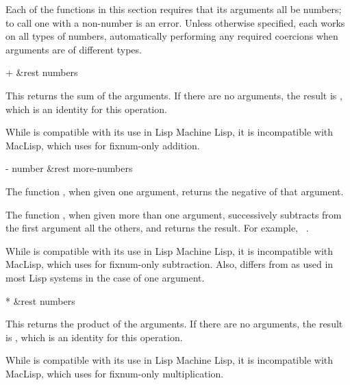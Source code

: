 Each of the functions in this section requires that its arguments all be
numbers; to call one with a non-number is an error.  Unless otherwise
specified, each works on all types of numbers, automatically performing
any required coercions when arguments are of different types.

\begin{defun}[Function]
+ &rest numbers

This returns the sum of the arguments.  If there are no arguments, the result
is , which is an identity for this operation.

\beforenoterule
\begin{incompatibility}
While \cd{+} is compatible with its use in Lisp Machine Lisp,
it is incompatible with MacLisp, which uses \cd{+} for fixnum-only
addition.
\end{incompatibility}
\afternoterule
\end{defun}

\begin{defun}[Function]
- number &rest more-numbers

The function \cdf{-}, when given one argument, returns the negative
of that argument.

The function \cdf{-}, when given more than one argument, successively subtracts
from the first argument all the others, and returns the result.
For example,  \EV\ .

\beforenoterule
\begin{incompatibility}
While \cdf{-} is compatible with its use in Lisp Machine Lisp,
it is incompatible with MacLisp, which uses \cdf{-} for fixnum-only
subtraction.
Also, \cdf{-} differs from  as used in most Lisp
systems in the case of one argument.
\end{incompatibility}
\afternoterule
\end{defun}

\begin{defun}[Function]
* &rest numbers

This returns the product of the arguments.
If there are no arguments, the result
is , which is an identity for this operation.

\beforenoterule
\begin{incompatibility}
While \cd{*} is compatible with its use in Lisp Machine Lisp,
it is incompatible with MacLisp, which uses \cd{*} for fixnum-only
multiplication.
\end{incompatibility}
\afternoterule
\end{defun}

